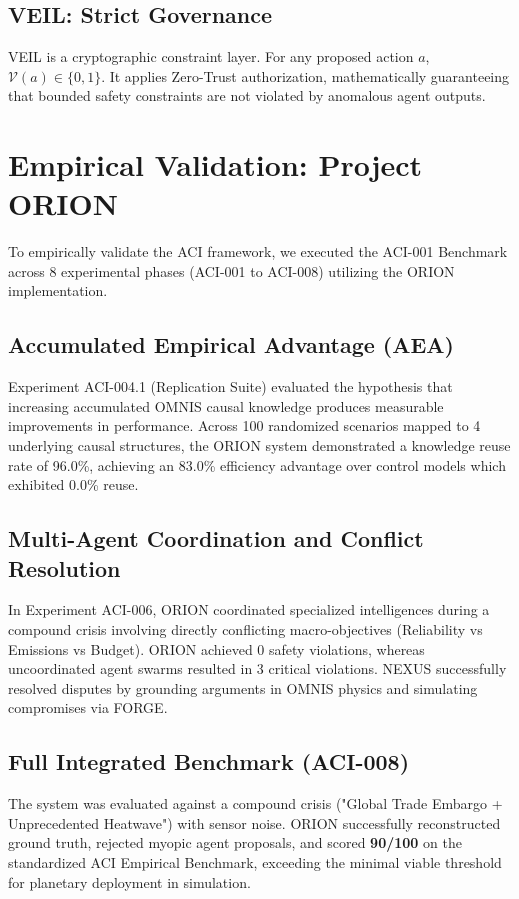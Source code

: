 \documentclass[11pt,twocolumn]{article}
\begin{document}
\subsection{VEIL: Strict Governance}
VEIL is a cryptographic constraint layer. For any proposed action $a$, $\mathcal{V}(a) \in \{0, 1\}$. It applies Zero-Trust authorization, mathematically guaranteeing that bounded safety constraints are not violated by anomalous agent outputs.

\section{Empirical Validation: Project ORION}
\label{sec:orion}
To empirically validate the ACI framework, we executed the ACI-001 Benchmark across 8 experimental phases (ACI-001 to ACI-008) utilizing the ORION implementation.

\subsection{Accumulated Empirical Advantage (AEA)}
Experiment ACI-004.1 (Replication Suite) evaluated the hypothesis that increasing accumulated OMNIS causal knowledge produces measurable improvements in performance. Across 100 randomized scenarios mapped to 4 underlying causal structures, the ORION system demonstrated a knowledge reuse rate of 96.0\%, achieving an 83.0\% efficiency advantage over control models which exhibited 0.0\% reuse.

\subsection{Multi-Agent Coordination and Conflict Resolution}
In Experiment ACI-006, ORION coordinated specialized intelligences during a compound crisis involving directly conflicting macro-objectives (Reliability vs Emissions vs Budget). ORION achieved 0 safety violations, whereas uncoordinated agent swarms resulted in 3 critical violations. NEXUS successfully resolved disputes by grounding arguments in OMNIS physics and simulating compromises via FORGE.

\subsection{Full Integrated Benchmark (ACI-008)}
The system was evaluated against a compound crisis ("Global Trade Embargo + Unprecedented Heatwave") with sensor noise. ORION successfully reconstructed ground truth, rejected myopic agent proposals, and scored \textbf{90/100} on the standardized ACI Empirical Benchmark, exceeding the minimal viable threshold for planetary deployment in simulation.
\end{document}
